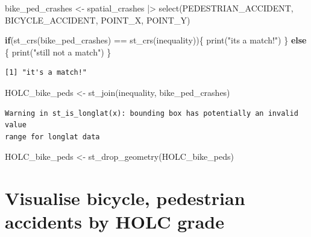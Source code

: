 \documentclass[
  letterpaper,
  DIV=11,
  numbers=noendperiod]{scrartcl}
\newenvironment{Shaded}{\begin{snugshade}}{\end{snugshade}}
\newcommand{\ControlFlowTok}[1]{\textcolor[rgb]{0.00,0.23,0.31}{\textbf{#1}}}
\newcommand{\FunctionTok}[1]{\textcolor[rgb]{0.28,0.35,0.67}{#1}}
\newcommand{\NormalTok}[1]{\textcolor[rgb]{0.00,0.23,0.31}{#1}}
\newcommand{\OtherTok}[1]{\textcolor[rgb]{0.00,0.23,0.31}{#1}}
\newcommand{\SpecialCharTok}[1]{\textcolor[rgb]{0.37,0.37,0.37}{#1}}
\newcommand{\StringTok}[1]{\textcolor[rgb]{0.13,0.47,0.30}{#1}}
\begin{document}
\begin{Shaded}
\begin{Highlighting}[]
\NormalTok{bike\_ped\_crashes }\OtherTok{\textless{}{-}}\NormalTok{ spatial\_crashes }\SpecialCharTok{|\textgreater{}} 
  \FunctionTok{select}\NormalTok{(PEDESTRIAN\_ACCIDENT, BICYCLE\_ACCIDENT, POINT\_X, POINT\_Y)}

\ControlFlowTok{if}\NormalTok{(}\FunctionTok{st\_crs}\NormalTok{(bike\_ped\_crashes) }\SpecialCharTok{==} \FunctionTok{st\_crs}\NormalTok{(inequality))\{}
  \FunctionTok{print}\NormalTok{(}\StringTok{"it\textquotesingle{}s a match!"}\NormalTok{)}
\NormalTok{\} }\ControlFlowTok{else}\NormalTok{ \{}
  \FunctionTok{print}\NormalTok{(}\StringTok{"still not a match"}\NormalTok{)}
\NormalTok{\}}
\end{Highlighting}
\end{Shaded}

\begin{verbatim}
[1] "it's a match!"
\end{verbatim}

\begin{Shaded}
\begin{Highlighting}[]
\NormalTok{HOLC\_bike\_peds }\OtherTok{\textless{}{-}} \FunctionTok{st\_join}\NormalTok{(inequality, bike\_ped\_crashes)}
\end{Highlighting}
\end{Shaded}

\begin{verbatim}
Warning in st_is_longlat(x): bounding box has potentially an invalid value
range for longlat data
\end{verbatim}

\begin{Shaded}
\begin{Highlighting}[]
\NormalTok{HOLC\_bike\_peds }\OtherTok{\textless{}{-}} \FunctionTok{st\_drop\_geometry}\NormalTok{(HOLC\_bike\_peds)}
\end{Highlighting}
\end{Shaded}

\section{Visualise bicycle, pedestrian accidents by HOLC
grade}\label{visualise-bicycle-pedestrian-accidents-by-holc-grade}
\end{document}
